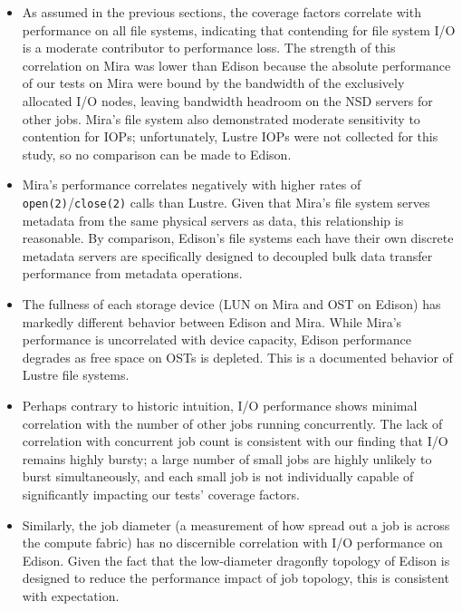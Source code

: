 \begin{itemize}

\item As assumed in the previous sections, the coverage factors correlate with performance on all file systems, indicating that contending for file system I/O is a moderate contributor to performance loss.
The strength of this correlation on Mira was lower than Edison because the absolute performance of our tests on Mira were bound by the bandwidth of the exclusively allocated I/O nodes, leaving bandwidth headroom on the NSD servers for other jobs.
Mira's file system also demonstrated moderate sensitivity to contention for IOPs; unfortunately, Lustre IOPs were not collected for this study, so no comparison can be made to Edison.

\item Mira's performance correlates negatively with higher rates of \texttt{open(2)}/\texttt{close(2)} calls than Lustre.
Given that Mira's file system serves metadata from the same physical servers as data, this relationship is reasonable.
By comparison, Edison's file systems each have their own discrete metadata servers are specifically designed to decoupled bulk data transfer performance from metadata operations.

\item The fullness of each storage device (LUN on Mira and OST on Edison) has markedly different behavior between Edison and Mira.
While Mira's performance is uncorrelated with device capacity, Edison performance degrades as free space on OSTs is depleted.
This is a documented behavior of Lustre file systems.

\item Perhaps contrary to historic intuition, I/O performance shows minimal correlation with the number of other jobs running concurrently.
The lack of correlation with concurrent job count is consistent with our finding that I/O remains highly bursty; a large number of small jobs are highly unlikely to burst simultaneously, and each small job is not individually capable of significantly impacting our tests' coverage factors.

\item Similarly, the job diameter (a measurement of how spread out a job is across the compute fabric) has no discernible correlation with I/O performance on Edison.
Given the fact that the low-diameter dragonfly topology of Edison is designed to reduce the performance impact of job topology, this is consistent with expectation.

\end{itemize}

